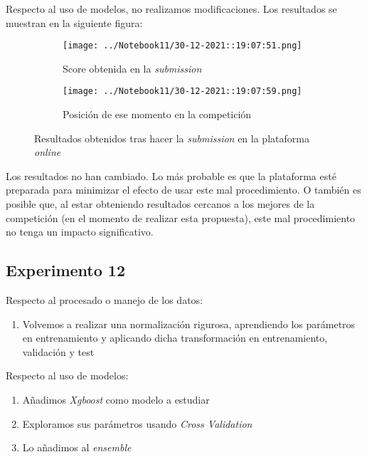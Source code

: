 \documentclass[11pt]{article}
\begin{document}
Respecto al uso de modelos, no realizamos modificaciones. Los resultados se muestran en la siguiente figura:

\begin{figure}[H]
    \centering

    \begin{subfigure}[b]{0.45 \textwidth}
        \texttt{[image: ../Notebook11/30-12-2021::19:07:51.png]}
        \caption{Score obtenida en la \emph{submission}}
    \end{subfigure}
    \begin{subfigure}[b]{0.45 \textwidth}
        \texttt{[image: ../Notebook11/30-12-2021::19:07:59.png]}
        \caption{Posición de ese momento en la competición}
    \end{subfigure}

    \caption{Resultados obtenidos tras hacer la \emph{submission} en la plataforma \emph{online}}
\end{figure}

Los resultados no han cambiado. Lo más probable es que la plataforma esté preparada para minimizar el efecto de usar este mal procedimiento. O también es posible que, al estar obteniendo resultados cercanos a los mejores de la competición (en el momento de realizar esta propuesta), este mal procedimiento no tenga un impacto significativo.

\pagebreak

\subsection{Experimento 12}

Respecto al procesado o manejo de los datos:

\begin{enumerate}
    \item Volvemos a realizar una normalización rigurosa, aprendiendo los parámetros en entrenamiento y aplicando dicha transformación en entrenamiento, validación y test
\end{enumerate}

Respecto al uso de modelos:

\begin{enumerate}
    \item Añadimos \emph{Xgboost} como modelo a estudiar
    \item Exploramos sus parámetros usando \emph{Cross Validation}
    \item Lo añadimos al \emph{ensemble}
\end{enumerate}
\end{document}
